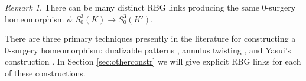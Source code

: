 \documentclass [11pt]{amsart}
\theoremstyle{remark}
\newtheorem {remark}[theorem]{Remark}
\begin{document}
%

%

\begin{remark}
There can be many distinct RBG links producing the same $0$-surgery homeomorphism $\phi: S^3_0(K) \to S^3_0(K')$.
\end{remark}

There are three primary techniques presently in the literature for constructing a 0-surgery homeomorphism: dualizable patterns \cite{Akb2Dhom, BakerMotegi, Brakes, GM, Lickorish2}, annulus twisting \cite{Osoinach}, 
and Yasui's construction \cite{Yasui}. In Section \ref{sec:otherconstr} we will give explicit RBG links for each of these constructions. 
\end{document}
